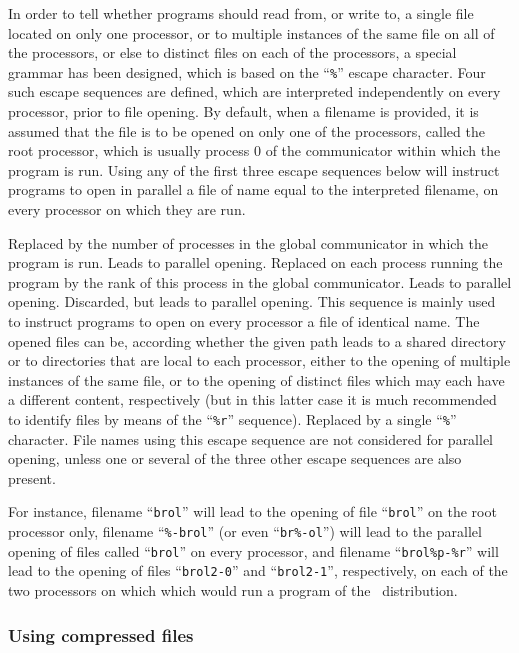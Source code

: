 In order to tell whether programs should read from, or write to, a single
file located on only one processor, or to multiple instances of the same
file on all of the processors, or else to distinct files on each of the
processors, a special grammar has been designed, which is based on the
``{\tt \%}'' escape character. Four such escape sequences are defined,
which are interpreted independently on every processor, prior to
file opening. By default, when a filename is provided, it is assumed
that the file is to be opened on only one of the processors, called
the root processor, which is usually process $0$ of the communicator
within which the program is run. Using any of the first three
escape sequences below will instruct programs to open in parallel a file
of name equal to the interpreted filename, on every processor on which they
are run.
\begin{itemize}
\iteme[{\tt \%p}]
Replaced by the number of processes in the global communicator in
which the program is run. Leads to parallel opening.
\iteme[{\tt \%r}]
Replaced on each process running the program by the rank of this
process in the global communicator. Leads to parallel opening.
\iteme[{\tt \%-}]
Discarded, but leads to parallel opening. This sequence is mainly used to
instruct programs to open on every processor a file of identical
name. The opened files can be, according whether the given path leads
to a shared directory or to directories that are local to each
processor, either to the opening of multiple instances of the same
file, or to the opening of distinct files which may each have a
different content, respectively (but in this latter case it is much
recommended to identify files by means of the ``{\tt \%r}'' sequence).
\iteme[{\tt \%\%}]
Replaced by a single ``{\tt \%}'' character. File names using this
escape sequence are not considered for parallel opening, unless one or
several of the three other escape sequences are also present.
\end{itemize}
For instance, filename ``{\tt brol}'' will lead to the
opening of file ``{\tt brol}'' on the root processor only, filename
``{\tt \%-brol}'' (or even ``{\tt br\%-ol}'') will lead to the
parallel opening of files called ``{\tt brol}'' on every processor,
and filename ``{\tt brol\%p-\%r}'' will lead to the opening of files
``{\tt brol2-0}'' and ``{\tt brol2-1}'', respectively, on each of the
two processors on which which would run a program of the
\ptscotch\ distribution.

\subsubsection{Using compressed files}
\label{sec-prog-compressed}

